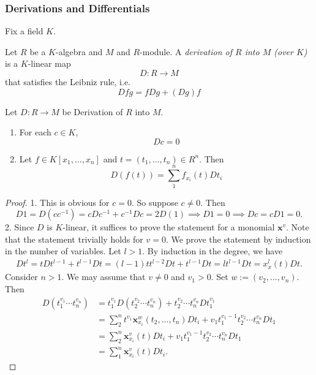 \subsubsection{Derivations and Differentials}
Fix a field $K$.
\begin{definition}
    Let $R$ be a $K$-algebra and $M$ and $R$-module. A \emph{derivation of $R$ into $M$ (over $K$)} is a $K$-linear map 
    $$
        D : R \rightarrow M
    $$
    that satisfies the Leibniz rule, i.e. 
    $$
        Dfg = fDg+ (Dg)f
    $$ 
\end{definition}
\begin{lemma}\label{ChainRuleForPolynomialExpressionInAlgebraOverField}
    Let $D: R\rightarrow M$ be Derivation of $R$ into $M$. 
    \begin{enumerate}
        \item For each $c\in K$, 
        $$
            Dc = 0
        $$ 
        \item Let $f\in K[x_1,\dots,x_n]$ and $t=(t_1,\dots,t_n)\in R^n$. Then 
        $$
            D(f(t)) = \sum_1^n f_{x_i}(t)Dt_i
        $$
    \end{enumerate}
\end{lemma}
\begin{proof}
    1. This is obvious for $c=0$. So suppose $c\neq 0$. Then 
    $$
        D1 = D(cc^{-1})=cDc^{-1}+c^{-1}Dc= 2D(1) \implies D1=0 \implies Dc=cD1=0.
    $$
    2. 
    Since $D$ is $K$-linear, it suffices to prove the statement for a monomial $\mathbf{x}^v$. Note that the statement trivially holds for $v=0$. We prove the statement by induction in the number of variables. Let $l>1$. By induction in the degree, we have
    \begin{align*}
        Dt^l= t Dt^{l-1} + t^{l-1}Dt = (l-1)tt^{l-2}Dt + t^{l-1}Dt =  lt^{l-1}Dt = x^l_{x}(t)Dt.
    \end{align*} 
    Consider $n>1$. We may assume that $v\neq 0$ and $v_1>0$. Set $w:=(v_2,\dots,v_n)$. Then 
    \begin{align*}
        D\left(t_1^{v_1}\cdots t_n^{v_n}\right) &= t_1^{v_1}D\left(t_2^{v_2} \cdots t_n^{v_n}\right) + t_2^{v_2}\cdots t_n^{v_n}D t_1^{v_1}\\
        &= \sum_2^n t^{v_1}\mathbf{x}^w_{x_i}(t_2,\dots,t_n)D t_i + v_1t_1^{v_1-1}t_2^{v_2}\cdots t_n^{v_n}D t_1 \\
        &= \sum_2^n \mathbf{x}^v_{x_i}(t)Dt_i + v_1t_1^{v_1-1}t_2^{v_2}\cdots t_n^{v_n}D t_1 \\
        &= \sum_1^n \mathbf{x}^v_{x_i}(t)Dt_i.
    \end{align*}
\end{proof}

